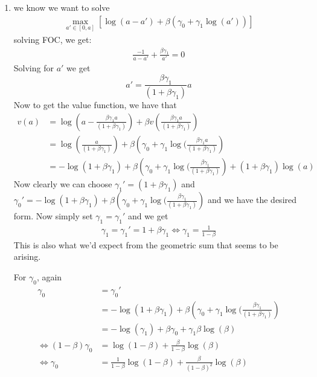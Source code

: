 \documentclass[12pt]{article}
\begin{document}
\begin{enumerate}
\item we know we want to solve
	\begin{align*}
		\max_{a' \in [0,a]} \left[\log(a - a') + \beta ( \gamma_0 + \gamma_1 \log(a')) \right]
	\end{align*}
	solving FOC, we get:
	\begin{align*}
		\frac{-1}{a - a'} + \frac{\beta \gamma_1}{a'} = 0 
	\end{align*}
	Solving for $a'$ we get
	$$a' = \frac{\beta \gamma_1}{(1 + \beta \gamma_1)} a $$
	Now to get the value function,
	we have that 
	\begin{align*}
		v(a) &= \log(a - \frac{\beta \gamma_1 a}{(1 + \beta \gamma_1)} ) + \beta v(\frac{\beta \gamma_1 a}{(1 + \beta \gamma_1)} ) \\
		     &= \log(\frac{a}{(1 + \beta \gamma_1)} ) + \beta \left(\gamma_0 + \gamma_1 \log(\frac{\beta \gamma_1 a}{(1 + \beta \gamma_1)}  \right) \\
		     &= - \log(1 + \beta \gamma_1) + \beta \left( \gamma_0 + \gamma_1 \log(\frac{\beta \gamma_1 }{(1 + \beta \gamma_1)}  \right)  + (1 + \beta \gamma_1) \log(a)
	\end{align*}
	Now clearly we can choose $\gamma_1' = (1 + \beta \gamma_1)$ and $\gamma_0' = - \log(1 + \beta \gamma_1) + \beta \left( \gamma_0 + \gamma_1 \log(\frac{\beta \gamma_1 }{(1 + \beta \gamma_1)}  \right)$  and we have the desired form.
      Now simply set  $\gamma_1 = \gamma_1'$ and we get
      \begin{align*}
      	\gamma_1 = \gamma_1' = 1 + \beta \gamma_1 \iff \gamma_1 = \frac{1}{1 - \beta}
      \end{align*}
      This is also what we'd expect from the geometric sum that seems to be arising.

      For $\gamma_0$, again
      \begin{align*}
	      \gamma_0 &= \gamma_0' \\
		       &= - \log(1 + \beta \gamma_1) + \beta \left( \gamma_0 + \gamma_1 \log(\frac{\beta \gamma_1 }{(1 + \beta \gamma_1)}  \right) \\
		       &= - \log( \gamma_1) + \beta \gamma_0 + \gamma_1 \beta \log(\beta ) \\
	      \iff (1 - \beta) \gamma_0 &= \log(1 - \beta) + \frac{\beta}{1 - \beta} \log(\beta) \\
		      \iff \gamma_0 &= \frac{1}{1 - \beta} \log(1 - \beta) + \frac{\beta}{(1 - \beta)^2} \log(\beta)
      \end{align*}


\end{enumerate}
\end{document}
